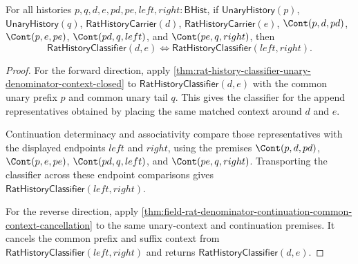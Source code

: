 \begin{theorem}
\label{thm:field-rat-denominator-matched-context-classifier-exactness}
For all histories $p,q,d,e,pd,pe,left,right:\mathsf{BHist}$, if
$\mathsf{UnaryHistory}(p)$, $\mathsf{UnaryHistory}(q)$,
$\mathsf{RatHistoryCarrier}(d)$, $\mathsf{RatHistoryCarrier}(e)$,
$\Cont(p,d,pd)$, $\Cont(p,e,pe)$, $\Cont(pd,q,left)$, and
$\Cont(pe,q,right)$, then
$$
\mathsf{RatHistoryClassifier}(d,e)\Longleftrightarrow
\mathsf{RatHistoryClassifier}(left,right).
$$
\end{theorem}
\begin{proof}
For the forward direction, apply
\autoref{thm:rat-history-classifier-unary-denominator-context-closed} to
$\mathsf{RatHistoryClassifier}(d,e)$ with the common unary prefix $p$ and
common unary tail $q$. This gives the classifier for the append representatives
obtained by placing the same matched context around $d$ and $e$.

Continuation determinacy and associativity compare those representatives with
the displayed endpoints $left$ and $right$, using the premises
$\Cont(p,d,pd)$, $\Cont(p,e,pe)$, $\Cont(pd,q,left)$, and
$\Cont(pe,q,right)$. Transporting the classifier across these endpoint
comparisons gives
$\mathsf{RatHistoryClassifier}(left,right)$.

For the reverse direction, apply
\autoref{thm:field-rat-denominator-continuation-common-context-cancellation}
to the same unary-context and continuation premises. It cancels the common
prefix and suffix context from $\mathsf{RatHistoryClassifier}(left,right)$ and
returns $\mathsf{RatHistoryClassifier}(d,e)$.
\end{proof}

